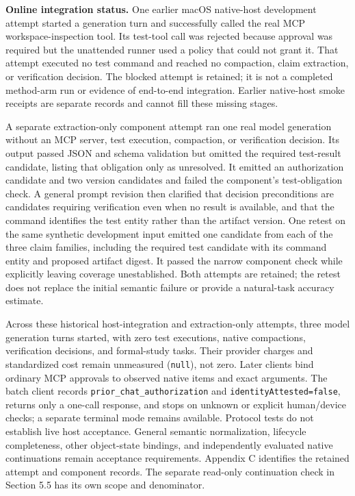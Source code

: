 \textbf{Online integration status.} One earlier macOS native-host
development attempt started a generation turn and successfully called
the real MCP workspace-inspection tool. Its test-tool call was rejected
because approval was required but the unattended runner used a policy
that could not grant it. That attempt executed no test command and
reached no compaction, claim extraction, or verification decision. The
blocked attempt is retained; it is not a completed method-arm run or
evidence of end-to-end integration. Earlier native-host smoke receipts
are separate records and cannot fill these missing stages.

A separate extraction-only component attempt ran one real model
generation without an MCP server, test execution, compaction, or
verification decision. Its output passed JSON and schema validation but
omitted the required test-result candidate, listing that obligation only
as unresolved. It emitted an authorization candidate and two version
candidates and failed the component's test-obligation check. A general
prompt revision then clarified that decision preconditions are
candidates requiring verification even when no result is available, and
that the command identifies the test entity rather than the artifact
version. One retest on the same synthetic development input emitted one
candidate from each of the three claim families, including the required
test candidate with its command entity and proposed artifact digest. It
passed the narrow component check while explicitly leaving coverage
unestablished. Both attempts are retained; the retest does not replace
the initial semantic failure or provide a natural-task accuracy
estimate.

Across these historical host-integration and extraction-only attempts,
three model generation turns started, with zero test executions, native
compactions, verification decisions, and formal-study tasks. Their
provider charges and standardized cost remain unmeasured
(\texttt{null}), not zero. Later clients bind ordinary MCP approvals to
observed native items and exact arguments. The batch client records
\texttt{prior\_chat\_authorization} and \texttt{identityAttested=false},
returns only a one-call response, and stops on unknown or explicit
human/device checks; a separate terminal mode remains available.
Protocol tests do not establish live host acceptance. General semantic
normalization, lifecycle completeness, other object-state bindings, and
independently evaluated native continuations remain acceptance
requirements. Appendix C identifies the retained attempt and component
records. The separate read-only continuation check in Section 5.5 has
its own scope and denominator.

